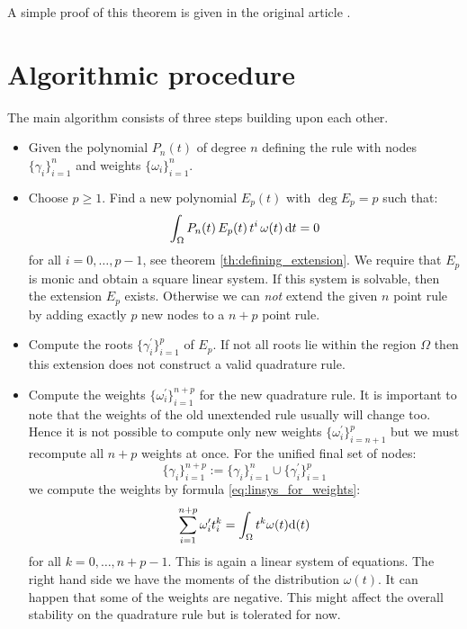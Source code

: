 \documentclass[a4paper,10pt]{article}
\begin{document}
A simple proof of this theorem is given in the original article \cite{mehrotra-papp}.



\FloatBarrier
\section{Algorithmic procedure}

The main algorithm consists of three steps building upon each other.

\begin{itemize}
  \item Given the polynomial $P_n(t)$ of degree $n$ defining the rule
    with nodes $\{\gamma_i\}_{i=1}^{n}$ and weights $\{\omega_i\}_{i=1}^{n}$.
  \item Choose $p \geq 1$.
    Find a new polynomial $E_p(t)$ with $\deg E_p = p$ such that:
    \begin{equation}
      \int_{\Omega} P_n(t) \, E_p(t) \, t^i \, \omega(t) \, \mathrm{d}t = 0
    \end{equation}
    for all $i = 0, \ldots, p-1$, see theorem \ref{th:defining_extension}.
    We require that $E_p$ is monic and obtain a square linear system.
    If this system is solvable, then the extension $E_p$ exists.
    Otherwise we can \emph{not} extend the given $n$ point rule by
    adding exactly $p$ new nodes to a $n+p$ point rule.
  \item Compute the roots $\{\gamma^\prime_i\}_{i=1}^{p}$ of $E_p$.
    If not all roots lie within the region $\Omega$ then this extension
    does not construct a valid quadrature rule.
  \item Compute the weights $\{\omega^\prime_i\}_{i=1}^{n+p}$ for the new
    quadrature rule. It is important to note that the weights of the old
    unextended rule usually will change too. Hence it is not possible to
    compute only new weights $\{\omega^\prime_i\}_{i=n+1}^{p}$ but we must
    recompute all $n+p$ weights at once. For the unified final set of nodes:
    \begin{equation}
      \{\gamma_i\}_{i=1}^{n+p} := \{\gamma_i\}_{i=1}^{n} \cup \{\gamma^\prime_i\}_{i=1}^{p}
    \end{equation}
    we compute the weights by formula \eqref{eq:linsys_for_weights}:
    \begin{equation}
      \sum_{i=1}^{n+p} \omega^\prime_i t_i^k = \int_{\Omega} t^k \omega(t) \mathrm{d}(t)
    \end{equation}
    for all $k=0, \ldots, n+p-1$. This is again a linear system
    of equations. The right hand side we have the moments of the
    distribution $\omega(t)$. It can happen that some of the weights
    are negative. This might affect the overall stability on the quadrature
    rule but is tolerated for now.
\end{itemize}
\end{document}
